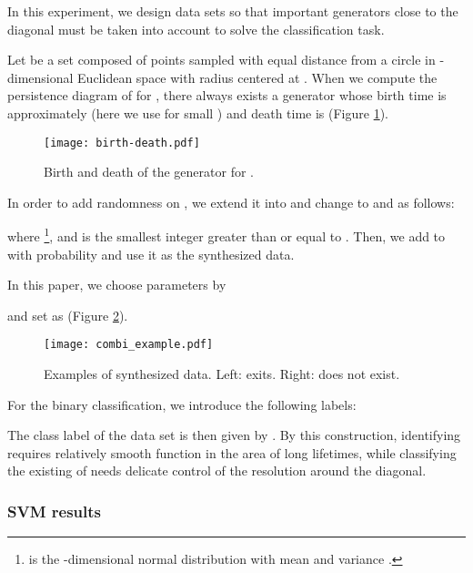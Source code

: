 \documentclass{article}
\begin{document}
In this experiment, we design data sets so that important generators close to the diagonal must be taken into account to solve the classification task.

Let 
 be a set composed of  points sampled with equal distance from a circle in -dimensional Euclidean space with radius  centered at .
When we compute the persistence diagram of  for , there always exists a generator whose birth time is approximately  (here we use  for small ) and death time is  (Figure \ref{fig:birth-death}).
\begin{figure}[htbp]
\begin{center}
\texttt{[image: birth-death.pdf]}
\end{center}
\caption{Birth and death of the generator for .}
\label{fig:birth-death}
\end{figure}

In order to add randomness on , we extend it into  and change  to  and  as follows:

where \footnote{ is the -dimensional normal distribution with mean  and variance .},  and  is the smallest integer greater than or equal to .
Then, we add  to  with probability  and use it as the synthesized data.

In this paper, we choose parameters by

and set  as  (Figure \ref{fig:synthesized}).
\begin{figure}[htbp]
\begin{center}
\texttt{[image: combi\_example.pdf]}
\end{center}
\caption{Examples of synthesized data.  Left:  exits. Right:  does not exist. }
\label{fig:synthesized}
\end{figure}

For the binary classification, we introduce the following labels:

The class label of the data set is then given by .
By this construction, identifying  requires relatively smooth function in the area of long lifetimes, while classifying the existing of  needs delicate control of the resolution around the diagonal.

\subsubsection{SVM results} 
\end{document}
